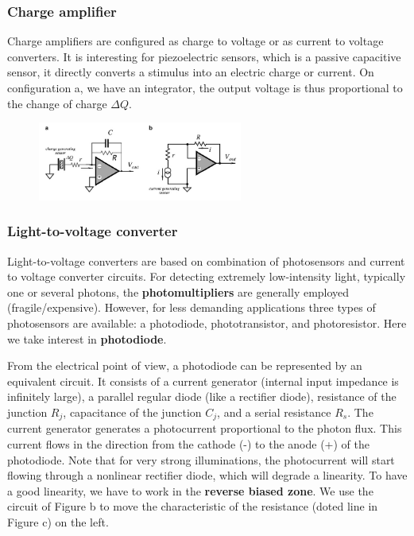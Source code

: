 \subsubsection{Charge amplifier}

Charge amplifiers are configured as charge to voltage or as current to voltage converters.
It is interesting for piezoelectric sensors, which is a passive capacitive sensor, it directly converts a stimulus into an electric charge or current. On configuration a, we have an integrator, the output voltage is thus proportional to the change of charge $\Delta Q$.

\begin{figure}[H]
    \centering
    \includegraphics[width = 0.6\textwidth]{L4/img/charge-amp.PNG}
\end{figure}

\subsubsection{Light-to-voltage converter}

Light-to-voltage converters are based on combination of photosensors and current to
voltage converter circuits. For detecting extremely low-intensity light, typically
one or several photons, the \textbf{photomultipliers} are generally employed (fragile/expensive).
However, for less demanding applications three types of photosensors are available:
a photodiode, phototransistor, and photoresistor. Here we take interest in \textbf{photodiode}.

From the electrical point of view, a photodiode can be represented by an
equivalent circuit. It consists of a current generator (internal
input impedance is infinitely large), a parallel regular diode (like a rectifier diode),
resistance of the junction $R_j$, capacitance of the junction $C_j$, and a serial resistance
$R_s$. The current generator generates a photocurrent proportional to the photon flux.
This current flows in the direction from the cathode (-) to the anode (+) of the
photodiode. Note that for very strong illuminations, the photocurrent will start
flowing through a nonlinear rectifier diode, which will degrade a linearity. To have a good linearity, we have to work in the \textbf{reverse biased zone}. We use the circuit of Figure b to move the characteristic of the resistance (doted line in Figure c) on the left.

